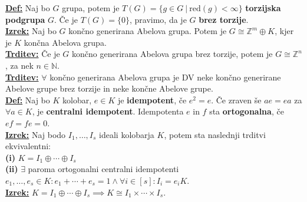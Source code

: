 \documentclass[a4paper,oneside,8pt,landscape]{extarticle}
\let\oldtextbf\textbf
\renewcommand{\textbf}[1]{\oldtextbf{\boldmath #1}}
\newcommand{\definicija}[1]{\textbf{\underline{Def:} }{#1}\\}
\newcommand{\trditev}[1]{\textbf{\underline{Trditev:} }{#1}\\}
\newcommand{\izrek}[1]{\textbf{\underline{Izrek:} }{#1}\\}
\newcommand{\bt}[1]{\textbf{#1}}
\begin{document}
\begin{multicols*}{3}
\definicija{Naj bo $G$ grupa, potem je $T(G) = \{g\in G \ | \ \text{red}(g) < \infty \}$ \bt{torzijska podgrupa} $G$. Če je $T(G) = \{0\}$, pravimo, da je $G$ \bt{brez torzije}.}
\izrek{Naj bo $G$ končno generirana Abelova grupa. Potem je $G\cong \mathbb{Z}^m \oplus K$, kjer je $K$ končna Abelova grupa.}
\trditev{Če je $G$ končno generirana Abelova grupa brez torzije, potem je $G\cong \mathbb{Z}^n$, za nek $n\in\mathbb{N}$.}
\trditev{$\forall$ končno generirana Abelova grupa je DV neke končno generirane Abelove grupe brez torzije in neke končne Abelove grupe.}
\definicija{Naj bo $K$ kolobar, $e\in K$ je \bt{idempotent}, če $e^2=e$. Če zraven še $ae=ea$ za $\forall a\in K$, je \bt{centralni idempotent}. Idempotenta $e$ in $f$ sta \bt{ortogonalna}, če $ef=fe=0$.}
\izrek{Naj bodo $I_1,\dots, I_s$ ideali kolobarja $K$, potem sta naslednji trditvi ekvivalentni: \\
\bt{(i)} $K=I_1\oplus \cdots \oplus I_s$ \\
\bt{(ii)} $\exists$ paroma ortogonalni centralni idempotenti $e_1,\dots,e_s\in K: e_1 + \cdots +e_s = 1 \land \forall i\in[s]: I_i = e_iK$.}
\izrek{$K=I_1\oplus \cdots \oplus I_s \implies K \cong I_1\times \cdots \times I_s$.}
\vspace{-15pt}

\end{multicols*}
\end{document}
